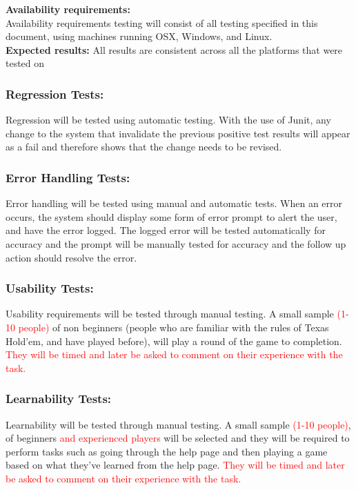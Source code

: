 \documentclass[12pt]{article}
\begin{document}
	\noindent \textbf{Availability requirements:}\\
    Availability requirements testing will consist of all testing specified in this document,
using machines running OSX, Windows, and Linux.\\
    \textbf{Expected results:} All results are consistent across all the platforms that were tested on


\subsubsection*{Regression Tests:}
Regression will be tested using automatic testing. With the use of Junit, any change to the system that invalidate the previous positive test results will appear as a fail and therefore shows that the change needs to be revised.

\subsubsection*{Error Handling Tests:}
Error handling will be tested using manual and automatic tests. When an error occurs, the system should display some form of error prompt to alert the user, and have the error logged. The logged error will be tested automatically for accuracy and the prompt will be manually tested for accuracy and the follow up action should resolve the error. 

\subsubsection*{Usability Tests:}
Usability requirements will be tested through manual testing. A small sample \textcolor{red}{(1-10 people)} of non beginners (people who are familiar with the rules of Texas Hold'em, and have played before), will play a round of the game to completion. \textcolor{red}{They will be timed and later be asked to comment on their experience with the task.}

\subsubsection*{Learnability Tests:}
Learnability will be tested through manual testing. A small sample \textcolor{red}{(1-10 people)}, of beginners \textcolor{red}{and experienced players} will be selected and they will be required to perform tasks such as going through the help page and then playing a game based on what they’ve learned from the help page. \textcolor{red}{They will be timed and later be asked to comment on their experience with the task.}
\end{document}
